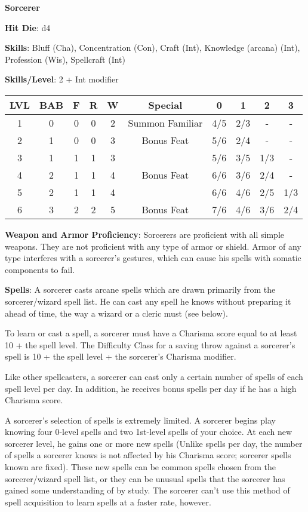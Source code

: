 \textbf{\huge{Sorcerer}}

\textbf{Hit Die}: d4

\textbf{Skills}: Bluff (Cha), Concentration (Con), Craft (Int), Knowledge (arcana) (Int), Profession (Wis), Spellcraft (Int)

\textbf{Skills/Level}: 2 + Int modifier

\begin{center}
\begin{adjustwidth}{-4cm}{}
\begin{small}
\begin{tabular}{| c | c | c | c | c | c | c | c | c | c |}
\hline
LVL &BAB &F &R &W &Special &0 &1 &2 &3 \\
\hline
1 &0 &0 &0 &2 &Summon Familiar &4/5 &2/3 &- &- \\
2 &1 &0 &0 &3 &Bonus Feat &5/6 &2/4 &- &- \\
3 &1 &1 &1 &3 & &5/6 &3/5 &1/3 &- \\
4 &2 &1 &1 &4 &Bonus Feat &6/6 &3/6 &2/4 &- \\
5 &2 &1 &1 &4 & &6/6 &4/6 &2/5 &1/3 \\
6 &3 &2 &2 &5 &Bonus Feat &7/6 &4/6 &3/6 &2/4 \\
\hline
\end{tabular}
\end{small}
\end{adjustwidth}
\end{center}

\textbf{Weapon and Armor Proficiency}: Sorcerers are proficient with all simple weapons. They are not proficient with any type of armor or shield. Armor of any type interferes with a sorcerer’s gestures, which can cause his spells with somatic components to fail.

\textbf{Spells}: A sorcerer casts arcane spells which are drawn primarily from the sorcerer/wizard spell list. He can cast any spell he knows without preparing it ahead of time, the way a wizard or a cleric must (see below).

To learn or cast a spell, a sorcerer must have a Charisma score equal to at least 10 + the spell level. The Difficulty Class for a saving throw against a sorcerer’s spell is 10 + the spell level + the sorcerer’s Charisma modifier.

Like other spellcasters, a sorcerer can cast only a certain number of spells of each spell level per day. In addition, he receives bonus spells per day if he has a high Charisma score.

A sorcerer’s selection of spells is extremely limited. A sorcerer begins play knowing four 0-level spells and two 1st-level spells of your choice. At each new sorcerer level, he gains one or more new spells (Unlike spells per day, the number of spells a sorcerer knows is not affected by his Charisma score; sorcerer spells known are fixed). These new spells can be common spells chosen from the sorcerer/wizard spell list, or they can be unusual spells that the sorcerer has gained some understanding of by study. The sorcerer can’t use this method of spell acquisition to learn spells at a faster rate, however.


